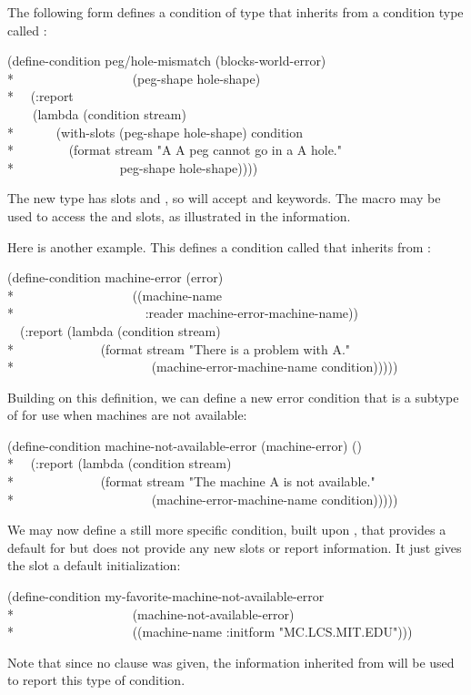 \begin{defmac}
The following form defines a condition of type  that
inherits from a condition type called :
\begin{lisp}
(define-condition peg/hole-mismatch (blocks-world-error) \\*
~~~~~~~~~~~~~~~~~~(peg-shape hole-shape) \\*
~~(:report \\
~~~~(lambda (condition stream) \\*
~~~~~~(with-slots (peg-shape hole-shape) condition \\*
~~~~~~~~(format stream "A {\Xtilde}A peg cannot go in a {\Xtilde}A hole." \\*
~~~~~~~~~~~~~~~~peg-shape hole-shape))))
\end{lisp}
The new type has slots  and , so
 will accept  and 
keywords. The  macro may be used to access the 
and  slots, as illustrated in the  information.

Here is another example. This defines a condition called 
that inherits from :
\begin{lisp}
(define-condition machine-error (error) \\*
~~~~~~~~~~~~~~~~~~((machine-name \\*
~~~~~~~~~~~~~~~~~~~~:reader machine-error-machine-name)) \\
~~(:report (lambda (condition stream) \\*
~~~~~~~~~~~~~(format stream "There is a problem with {\Xtilde}A." \\*
~~~~~~~~~~~~~~~~~~~~~(machine-error-machine-name condition)))))
\end{lisp}
Building on this definition, we can define a new error condition that is a
subtype of  for use when machines are not available:
\begin{lisp}
(define-condition machine-not-available-error (machine-error) () \\*
~~(:report (lambda (condition stream) \\*
~~~~~~~~~~~~~(format stream "The machine {\Xtilde}A is not available." \\*
~~~~~~~~~~~~~~~~~~~~~(machine-error-machine-name condition)))))
\end{lisp}
We may now define a still more specific condition, built upon
, that provides a default for 
but does not provide any new slots or report information. It just gives the
 slot a default initialization:
\begin{lisp}
(define-condition my-favorite-machine-not-available-error \\*
~~~~~~~~~~~~~~~~~~(machine-not-available-error) \\*
~~~~~~~~~~~~~~~~~~((machine-name :initform "MC.LCS.MIT.EDU")))
\end{lisp}
Note that since no  clause was given, the information inherited from
 will be used to report this type of condition.
\end{defmac}

